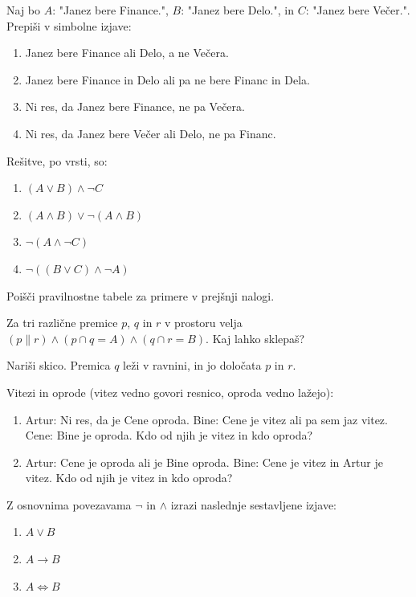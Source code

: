 \documentclass[11pt,paper=b5,footinclude,headinclude]{scrbook} %
\newtheorem{ex}{Vaja\hypertarget{sol:\theex}}[chapter]
\begin{document}
\begin{ex}
 Naj bo $A$: "Janez bere Finance.", $B$: "Janez bere Delo.", in $C$: "Janez bere Večer.".
Prepiši v simbolne izjave:
\begin{enumerate}
  \item Janez bere Finance ali Delo, a ne Večera. 
  \item Janez bere Finance in Delo ali pa ne bere Financ in Dela. 
  \item Ni res, da Janez bere Finance, ne pa Večera. 
  \item Ni res, da Janez bere Večer ali Delo, ne pa Financ. 
\end{enumerate}
\begin{sol}Rešitve, po vrsti, so:
    \begin{enumerate}
        \item $(A \lor B) \land \neg C$
        \item $(A \land B) \lor \neg (A \land B)$
        \item $\neg (A \land \neg C)$
        \item $\neg ((B \lor C) \land \neg A)$
    \end{enumerate}
\end{sol}
\end{ex} \begin{ex} Poišči pravilnostne tabele za primere v prejšnji nalogi.

\end{ex} \begin{ex} Za tri različne premice $p$, $q$ in $r$ v prostoru velja $(p \parallel r) \land (p \cap q = A) \land (q \cap r = B)$. Kaj lahko sklepaš? 
\begin{sol}
 Nariši skico. Premica $q$ leži v ravnini, in jo določata $p$ in $r$.
\end{sol}

\end{ex} \begin{ex} Vitezi in oprode (vitez vedno govori resnico, oproda vedno lažejo):
\begin{enumerate}
  \item Artur: Ni res, da je Cene oproda.
  Bine: Cene je vitez ali pa sem jaz vitez.
  Cene: Bine je oproda.
  Kdo od njih je vitez in kdo oproda?
  \item Artur: Cene je oproda ali je Bine oproda.
  Bine: Cene je vitez in Artur je vitez.
  Kdo od njih je vitez in kdo oproda?
\end{enumerate}

\end{ex} \begin{ex} Z osnovnima povezavama $\neg$ in $\land$ izrazi naslednje sestavljene izjave:
\begin{enumerate}
  \item $A \lor B$
  \item $A \rightarrow B$
  \item $A \iff B$
\end{enumerate}


\end{ex}
\end{document}
